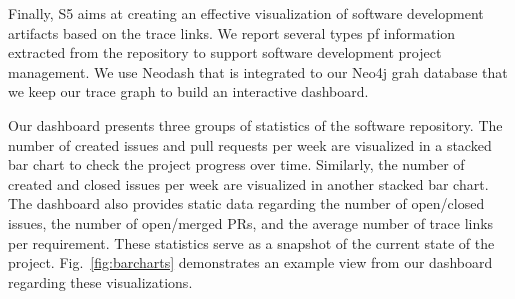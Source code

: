 





Finally, \textsf{S5} aims at creating an effective visualization of software development artifacts based on the trace links. We report several types pf information extracted from the repository to support software development project management. We use Neodash that is integrated to our Neo4j grah database that we keep our trace graph to build an interactive dashboard.

Our dashboard presents three groups of  statistics of the software repository.  The number of created issues and pull requests per week  are visualized in a stacked bar chart to check the project progress over time. Similarly, the number of created and closed issues per week are visualized in another stacked bar chart. The dashboard also provides static data regarding the number of open/closed issues, the number of open/merged PRs, and the average number of trace links per requirement. These statistics serve as a snapshot of the current state of the project. Fig.~\ref{fig:barcharts} demonstrates an example view from our dashboard regarding these visualizations.



